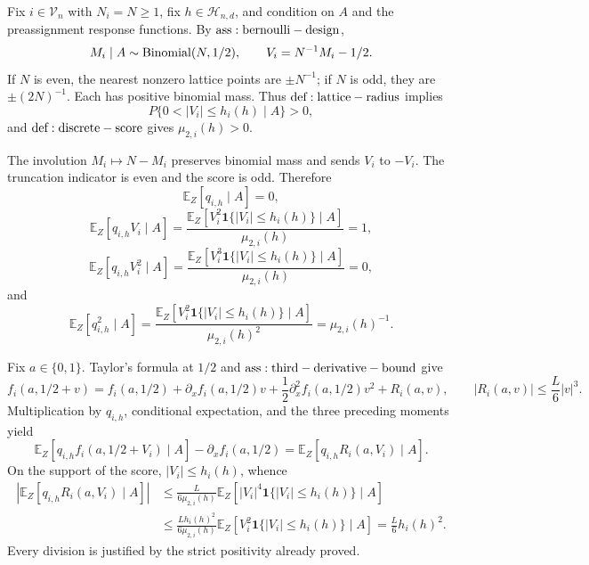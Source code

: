 Fix \(i\in\mathcal V_n\) with \(N_i=N\geq1\), fix \(h\in\mathcal H_{n,d}\), and condition on \(A\) and the preassignment response functions.  By \({\rm ass:bernoulli-design}\),
\[
 M_i\mid A\sim{\rm Binomial}(N,1/2),\qquad V_i=N^{-1}M_i-1/2.
\]
If \(N\) is even, the nearest nonzero lattice points are \(\pm N^{-1}\); if \(N\) is odd, they are \(\pm(2N)^{-1}\).  Each has positive binomial mass.  Thus \({\rm def:lattice-radius}\) implies
\[
 P\{0<|V_i|\leq h_i(h)\mid A\}>0,
\]
and \({\rm def:discrete-score}\) gives \(\mu_{2,i}(h)>0\).

The involution \(M_i\mapsto N-M_i\) preserves binomial mass and sends \(V_i\) to \(-V_i\).  The truncation indicator is even and the score is odd.  Therefore
\[
 \mathbb E_Z[q_{i,h}\mid A]=0,
\]
\[
 \mathbb E_Z[q_{i,h}V_i\mid A]
 =\frac{\mathbb E_Z[V_i^2\mathbf1\{|V_i|\leq h_i(h)\}\mid A]}{\mu_{2,i}(h)}=1,
\]
\[
 \mathbb E_Z[q_{i,h}V_i^2\mid A]
 =\frac{\mathbb E_Z[V_i^3\mathbf1\{|V_i|\leq h_i(h)\}\mid A]}{\mu_{2,i}(h)}=0,
\]
and
\[
 \mathbb E_Z[q_{i,h}^2\mid A]
 =\frac{\mathbb E_Z[V_i^2\mathbf1\{|V_i|\leq h_i(h)\}\mid A]}{\mu_{2,i}(h)^2}
 =\mu_{2,i}(h)^{-1}.
\]

Fix \(a\in\{0,1\}\).  Taylor's formula at \(1/2\) and \({\rm ass:third-derivative-bound}\) give
\[
 f_i(a,1/2+v)=f_i(a,1/2)+\partial_xf_i(a,1/2)v
 +\frac12\partial_x^2f_i(a,1/2)v^2+R_i(a,v),
 \qquad |R_i(a,v)|\leq \frac L6|v|^3.
\]
Multiplication by \(q_{i,h}\), conditional expectation, and the three preceding moments yield
\[
 \mathbb E_Z[q_{i,h}f_i(a,1/2+V_i)\mid A]-\partial_xf_i(a,1/2)
 =\mathbb E_Z[q_{i,h}R_i(a,V_i)\mid A].
\]
On the support of the score, \(|V_i|\leq h_i(h)\), whence
\[
\begin{aligned}
 \left|\mathbb E_Z[q_{i,h}R_i(a,V_i)\mid A]\right|
 &\leq \frac{L}{6\mu_{2,i}(h)}
 \mathbb E_Z[|V_i|^4\mathbf1\{|V_i|\leq h_i(h)\}\mid A]\\
 &\leq \frac{Lh_i(h)^2}{6\mu_{2,i}(h)}
 \mathbb E_Z[V_i^2\mathbf1\{|V_i|\leq h_i(h)\}\mid A]
 =\frac L6h_i(h)^2.
\end{aligned}
\]
Every division is justified by the strict positivity already proved.
